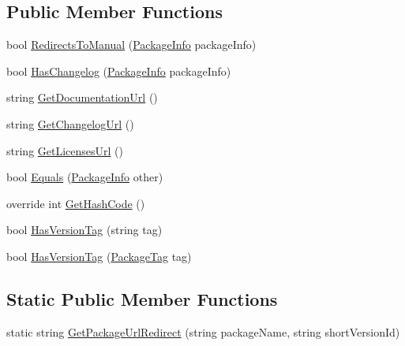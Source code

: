 \subsection*{Public Member Functions}
\begin{DoxyCompactItemize}
\item 
bool \mbox{\hyperlink{class_unity_editor_1_1_package_manager_1_1_u_i_1_1_package_info_a03d825c68ddab1ff6f9e0244bca21a6a}{Redirects\+To\+Manual}} (\mbox{\hyperlink{class_unity_editor_1_1_package_manager_1_1_u_i_1_1_package_info}{Package\+Info}} package\+Info)
\item 
bool \mbox{\hyperlink{class_unity_editor_1_1_package_manager_1_1_u_i_1_1_package_info_addb2eb2857948538853897bf76743aea}{Has\+Changelog}} (\mbox{\hyperlink{class_unity_editor_1_1_package_manager_1_1_u_i_1_1_package_info}{Package\+Info}} package\+Info)
\item 
string \mbox{\hyperlink{class_unity_editor_1_1_package_manager_1_1_u_i_1_1_package_info_a5c12ef8e01f0de50ffdb25e36ba7864e}{Get\+Documentation\+Url}} ()
\item 
string \mbox{\hyperlink{class_unity_editor_1_1_package_manager_1_1_u_i_1_1_package_info_ae61a7b5bd59add6b1db9eb696c666533}{Get\+Changelog\+Url}} ()
\item 
string \mbox{\hyperlink{class_unity_editor_1_1_package_manager_1_1_u_i_1_1_package_info_a112f0fd0999127b5599d3e1ff6dfa1f2}{Get\+Licenses\+Url}} ()
\item 
bool \mbox{\hyperlink{class_unity_editor_1_1_package_manager_1_1_u_i_1_1_package_info_a1f6449337b576d780dca5a6ba90c6177}{Equals}} (\mbox{\hyperlink{class_unity_editor_1_1_package_manager_1_1_u_i_1_1_package_info}{Package\+Info}} other)
\item 
override int \mbox{\hyperlink{class_unity_editor_1_1_package_manager_1_1_u_i_1_1_package_info_aceba5308a9e9626e42889fe1c3503156}{Get\+Hash\+Code}} ()
\item 
bool \mbox{\hyperlink{class_unity_editor_1_1_package_manager_1_1_u_i_1_1_package_info_af0fa791bd7aa34dfec5f1dbdbddcb7dd}{Has\+Version\+Tag}} (string tag)
\item 
bool \mbox{\hyperlink{class_unity_editor_1_1_package_manager_1_1_u_i_1_1_package_info_a8c8d27185f47ae2a1d201d9072737f81}{Has\+Version\+Tag}} (\mbox{\hyperlink{namespace_unity_editor_1_1_package_manager_1_1_u_i_afd939208534e3c178925b2f726ab9efe}{Package\+Tag}} tag)
\end{DoxyCompactItemize}
\subsection*{Static Public Member Functions}
\begin{DoxyCompactItemize}
\item 
static string \mbox{\hyperlink{class_unity_editor_1_1_package_manager_1_1_u_i_1_1_package_info_a2c33bdbbdd79e3f30864d5841ad4d44c}{Get\+Package\+Url\+Redirect}} (string package\+Name, string short\+Version\+Id)
\end{DoxyCompactItemize}
